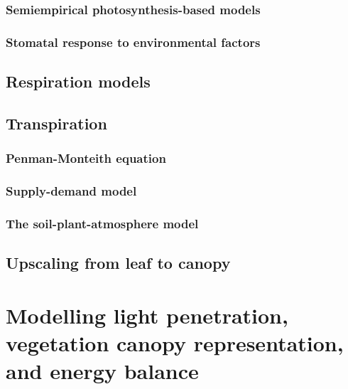 \documentclass[
  oneside]{book}
\begin{document}
\hypertarget{semiempirical-photosynthesis-based-models}{%
\subsection{Semiempirical photosynthesis-based models}\label{semiempirical-photosynthesis-based-models}}

\hypertarget{stomatal-response-to-environmental-factors}{%
\subsection{Stomatal response to environmental factors}\label{stomatal-response-to-environmental-factors}}

\hypertarget{respiration-models}{%
\section{Respiration models}\label{respiration-models}}

\hypertarget{transpiration}{%
\section{Transpiration}\label{transpiration}}

\hypertarget{penman-monteith-equation}{%
\subsection{Penman-Monteith equation}\label{penman-monteith-equation}}

\hypertarget{supply-demand-model}{%
\subsection{Supply-demand model}\label{supply-demand-model}}

\hypertarget{the-soil-plant-atmosphere-model}{%
\subsection{The soil-plant-atmosphere model}\label{the-soil-plant-atmosphere-model}}

\hypertarget{upscaling-from-leaf-to-canopy}{%
\section{Upscaling from leaf to canopy}\label{upscaling-from-leaf-to-canopy}}

\hypertarget{modelling-light-penetration-vegetation-canopy-representation-and-energy-balance}{%
\chapter{Modelling light penetration, vegetation canopy representation, and energy balance}\label{modelling-light-penetration-vegetation-canopy-representation-and-energy-balance}}
\end{document}
